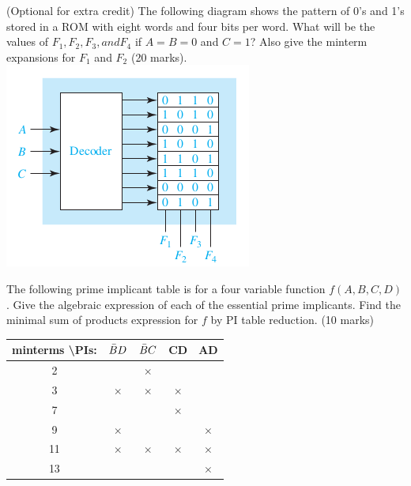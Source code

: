 \begin{prob}
  (Optional for extra credit) The following diagram shows the pattern of 0’s and 1’s stored in a ROM
  with eight words and four bits per word. What will be the values of $F_1 , F_2 ,
  F_3 , and F_4$ if $A= B = 0$ and $C = 1$?
  Also give the minterm expansions for $F_1$ and $F_2$ (20 marks).\\
  \includegraphics[width=0.4\linewidth]{./fig/ROM-minterms.png}
\end{prob}

\begin{prob}
  The following prime implicant table is for a four variable function $f(A, B,
  C, D)$.
  Give the algebraic expression of each of the essential prime implicants. Find
  the minimal sum of products expression for $f$ by PI table reduction. (10 marks)
  \\
  \begin{tabular}{ccccc}
    \toprule
    minterms \textbackslash PIs: & $\bar{B} D$ & $\bar{B} C$ & CD & AD  \\
    \midrule
    2  &   & $\times$ & & \\
    3  & $\times$ & $\times$ & $\times$ & \\ 
    7  &  & & $\times$ & \\ 
    9  & $\times$ & & & $\times$ \\ 
    11 & $\times$ & $\times$ & $\times$ & $\times$ \\ 
    13 &  & & & $\times$ \\
    \bottomrule
  \end{tabular}\\
\end{prob}

